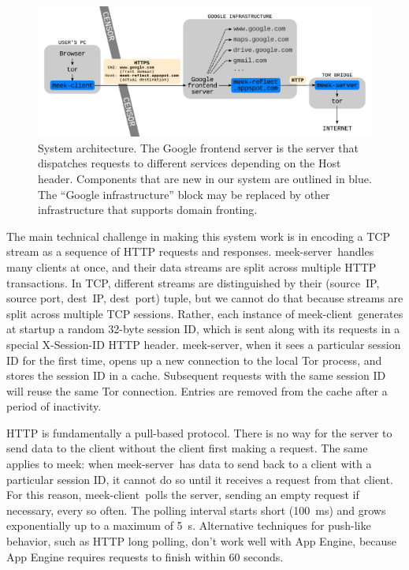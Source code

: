 \documentclass[conference]{IEEEtran}
\def\meekclient{\mbox{meek-client}}
\def\meekserver{\mbox{meek-server}}
\begin{document}
\begin{figure}
\centering
\includegraphics[width=\linewidth]{architecture}
\caption{
System architecture.
The Google frontend server is the server that dispatches requests to different services depending on the Host header.
Components that are new in our system are outlined in blue.
The ``Google infrastructure'' block may be replaced by other infrastructure that supports domain fronting.
}
\label{fig:architecture}
\end{figure}

The main technical challenge in making this system work
is in encoding a TCP stream as a sequence of HTTP requests and responses.
\meekserver\ handles many clients at once, and their data streams
are split across multiple HTTP transactions.
In TCP, different streams are distinguished by their
(source~IP, source port, dest~IP, dest~port) tuple,
but we cannot do that because streams are split across multiple TCP sessions.
Rather, each instance of \meekclient\ generates at startup a random 32-byte
session ID, which is sent along with its requests in a special
X-Session-ID HTTP header.
\meekserver, when it sees a particular session ID for the first time,
opens up a new connection to the local Tor process,
and stores the session ID in a cache. Subsequent requests with the
same session ID will reuse the same Tor connection.
Entries are removed from the cache after a period of inactivity.

HTTP is fundamentally a pull-based protocol.
There is no way for the server to send data to the client without
the client first making a request.
The same applies to meek: when \meekserver\ has data to send back to
a client with a particular session ID, it cannot do so until it
receives a request from that client.
For this reason, \meekclient\ polls the server,
sending an empty request if necessary, every so often.
The polling interval starts short (100~ms) and grows exponentially
up to a maximum of 5~s.
Alternative techniques for push-like behavior,
such as HTTP long polling,
don't work well with App Engine,
because App Engine requires requests to finish within 60 seconds.
\end{document}
